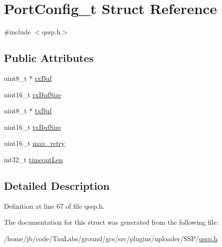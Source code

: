 \hypertarget{struct_port_config__t}{\section{\-Port\-Config\-\_\-t \-Struct \-Reference}
\label{struct_port_config__t}
}


{\ttfamily \#include $<$qssp.\-h$>$}

\subsection*{\-Public \-Attributes}
\begin{DoxyCompactItemize}
\item 
uint8\-\_\-t $\ast$ \hyperlink{group___uploader_ga351151bd718bd34e6b4acc0c33a315a1}{rx\-Buf}
\item 
uint16\-\_\-t \hyperlink{group___uploader_ga2f1cf7a3eabee4b4fa51aeedb4e7f708}{rx\-Buf\-Size}
\item 
uint8\-\_\-t $\ast$ \hyperlink{group___uploader_ga45f87f2e2a856d459c590f5a1a0ffeb4}{tx\-Buf}
\item 
uint16\-\_\-t \hyperlink{group___uploader_gacc8a53158605f7a72f895d2a80036137}{tx\-Buf\-Size}
\item 
uint16\-\_\-t \hyperlink{group___uploader_ga780cb1cf13c87035b0715a39dec4981b}{max\-\_\-retry}
\item 
int32\-\_\-t \hyperlink{group___uploader_ga13c21abf5c985cf8f33e4a6ccc45310f}{timeout\-Len}
\end{DoxyCompactItemize}


\subsection{\-Detailed \-Description}


\-Definition at line 67 of file qssp.\-h.



\-The documentation for this struct was generated from the following file\-:\begin{DoxyCompactItemize}
\item 
/home/jb/code/\-Tau\-Labs/ground/gcs/src/plugins/uploader/\-S\-S\-P/\hyperlink{qssp_8h}{qssp.\-h}\end{DoxyCompactItemize}
